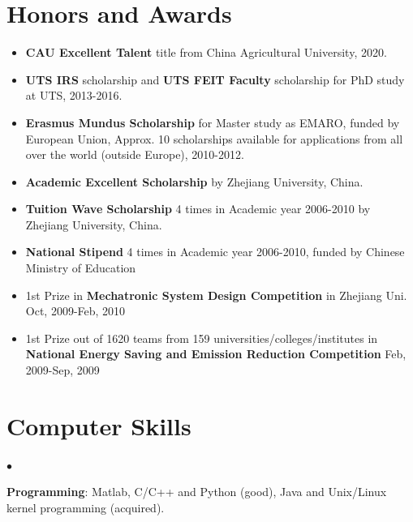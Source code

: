 \documentclass[margin,line]{res}
\newenvironment{list2}{
  \begin{list}{$\bullet$}{%
      \setlength{\itemsep}{0in}
      \setlength{\parsep}{0in} \setlength{\parskip}{0in}
      \setlength{\topsep}{0in} \setlength{\partopsep}{0in} 
      \setlength{\leftmargin}{0.2in}}}{\end{list}}
\begin{document}
\begin{resume}
\section{\sc Honors and Awards} 
\begin{itemize}

\item {\bf CAU Excellent Talent} title from China Agricultural University, 2020.

\vspace*{-2.5mm}
\item {\bf UTS IRS} %
scholarship and {\bf UTS FEIT Faculty} scholarship for PhD study at UTS, 2013-2016.

\vspace*{-2.5mm}
\item {\bf Erasmus Mundus Scholarship} for Master study as EMARO, funded by European Union, Approx. 10 scholarships available for applications from all over the world (outside Europe), 2010-2012.

\vspace*{-2.5mm}
\item {\bf Academic Excellent Scholarship} by Zhejiang University, China.

\vspace*{-2.5mm}
\item {\bf Tuition Wave Scholarship} 4 times in Academic year 2006-2010 by Zhejiang University, China.

\vspace*{-2.5mm}
\item {\bf National Stipend} 4 times in Academic year 2006-2010, funded by Chinese Ministry of Education

\vspace*{-2.5mm}
\item 1st Prize in {\bf Mechatronic System Design Competition} in Zhejiang Uni. Oct, 2009-Feb, 2010

\vspace*{-2.5mm}
\item 1st Prize out of 1620 teams from 159 universities/colleges/institutes in {\bf National Energy Saving and Emission Reduction Competition} Feb, 2009-Sep, 2009


\end{itemize}

\section{\sc Computer Skills} 
\begin{list2}
\item {\bf Programming}: Matlab, C/C++ and Python (good), Java and Unix/Linux kernel programming (acquired). \\


\end{list2}
\end{resume}
\end{document}
